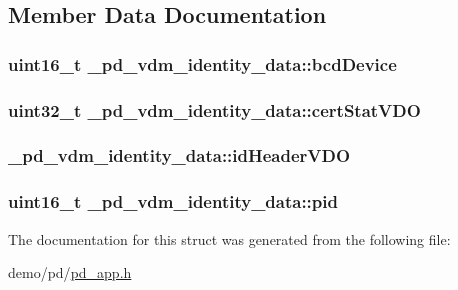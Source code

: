 \subsection{Member Data Documentation}
\hypertarget{struct__pd__vdm__identity__data_a2f30cd86743fe79ef17a8f660dbd3fd9}{
\subsubsection[{bcd\-Device}]{\setlength{\rightskip}{0pt plus 5cm}uint16\-\_\-t \-\_\-pd\-\_\-vdm\-\_\-identity\-\_\-data\-::bcd\-Device}}\label{struct__pd__vdm__identity__data_a2f30cd86743fe79ef17a8f660dbd3fd9}
\hypertarget{struct__pd__vdm__identity__data_a0d79e90688b2dbf6675f8efb6ac6c973}{
\subsubsection[{cert\-Stat\-V\-D\-O}]{\setlength{\rightskip}{0pt plus 5cm}uint32\-\_\-t \-\_\-pd\-\_\-vdm\-\_\-identity\-\_\-data\-::cert\-Stat\-V\-D\-O}}\label{struct__pd__vdm__identity__data_a0d79e90688b2dbf6675f8efb6ac6c973}
\hypertarget{struct__pd__vdm__identity__data_a1a5bca628bc1dca775f43f351328892e}{
\subsubsection[{id\-Header\-V\-D\-O}]{ \-\_\-pd\-\_\-vdm\-\_\-identity\-\_\-data\-::id\-Header\-V\-D\-O}}\label{struct__pd__vdm__identity__data_a1a5bca628bc1dca775f43f351328892e}
\hypertarget{struct__pd__vdm__identity__data_a77971a31b11bad8e3cfc5b159ea98360}{
\subsubsection[{pid}]{\setlength{\rightskip}{0pt plus 5cm}uint16\-\_\-t \-\_\-pd\-\_\-vdm\-\_\-identity\-\_\-data\-::pid}}\label{struct__pd__vdm__identity__data_a77971a31b11bad8e3cfc5b159ea98360}


The documentation for this struct was generated from the following file\-:\begin{DoxyCompactItemize}
\item 
demo/pd/\hyperlink{pd__app_8h}{pd\-\_\-app.\-h}\end{DoxyCompactItemize}
